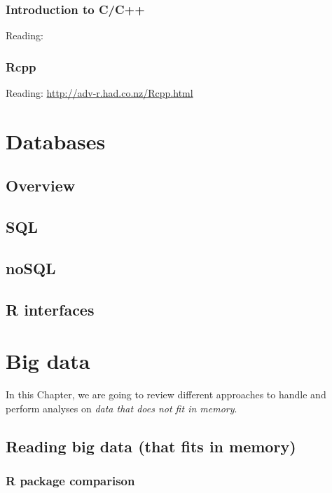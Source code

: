 \documentclass[]{book}
\theoremstyle{definition}
\theoremstyle{definition}
\theoremstyle{definition}
\theoremstyle{remark}
\begin{document}
\subsection{Introduction to C/C++}\label{introduction-to-cc}

Reading:

\subsection{Rcpp}\label{rcpp}

Reading: \url{http://adv-r.had.co.nz/Rcpp.html}

\chapter{Databases}\label{databases}

\section{Overview}\label{overview}

\section{SQL}\label{sql}

\section{noSQL}\label{nosql}

\section{R interfaces}\label{r-interfaces}

\chapter{Big data}\label{bigdata}

In this Chapter, we are going to review different approaches to handle
and perform analyses on \emph{data that does not fit in memory}.

\section{Reading big data (that fits in
memory)}\label{reading-big-data-that-fits-in-memory}

\subsection{R package comparison}\label{r-package-comparison}
\end{document}
